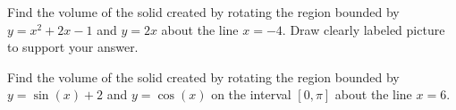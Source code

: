 \begin{questions}

\newpage
\question Find the volume of the solid created by rotating the region bounded by $y=x^2+2x-1$ and $y=2x$ about the line $x=-4$. Draw clearly labeled picture to support your answer.
\begin{solutionorbox}[9.25in]

\end{solutionorbox}

\question Find the volume of the solid created by rotating the region bounded by $y=\sin(x)+2$ and $y=\cos(x)$ on the interval $[0,\pi]$ about the line $x=6$.
\begin{solutionorbox}[9.25in]

\end{solutionorbox}



\end{questions}